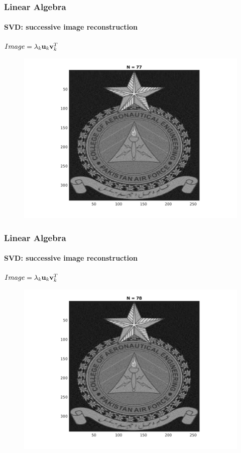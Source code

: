 \documentclass[hyperref={pdfpagelabels=true}]{beamer}
\begin{document}
\begin{frame}
\frametitle{Linear Algebra}
\framesubtitle{SVD: successive image reconstruction} 
\small{
\begin{center}
$Image = \lambda_k{\bf u}_k {\bf v}_k^T$
\end{center}}
\begin{figure}[!htb]
\centering
\includegraphics [scale=0.48]{n/b77.png}
\end{figure}
\end{frame}

\begin{frame}
\frametitle{Linear Algebra}
\framesubtitle{SVD: successive image reconstruction} 
\small{
\begin{center}
$Image = \lambda_k{\bf u}_k {\bf v}_k^T$
\end{center}}
\begin{figure}[!htb]
\centering
\includegraphics [scale=0.48]{n/b78.png}
\end{figure}
\end{frame}
\end{document}

